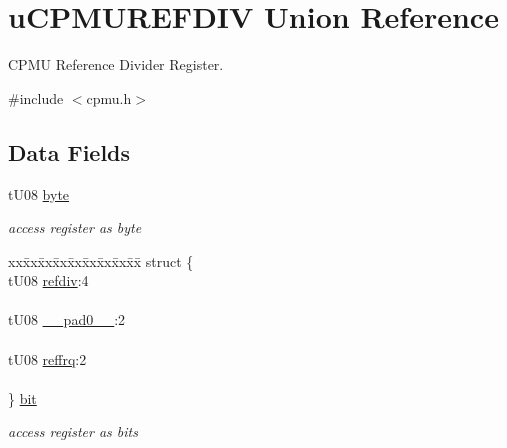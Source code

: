 \hypertarget{unionu_c_p_m_u_r_e_f_d_i_v}{}\section{u\+C\+P\+M\+U\+R\+E\+F\+D\+I\+V Union Reference}
\label{unionu_c_p_m_u_r_e_f_d_i_v}


C\+P\+M\+U Reference Divider Register.  




{\ttfamily \#include $<$cpmu.\+h$>$}

\subsection*{Data Fields}
\begin{DoxyCompactItemize}
\item 
\hypertarget{unionu_c_p_m_u_r_e_f_d_i_v_aba308d63db050aed25cfd36c37e41ad4}{}t\+U08 \hyperlink{unionu_c_p_m_u_r_e_f_d_i_v_aba308d63db050aed25cfd36c37e41ad4}{byte}\label{unionu_c_p_m_u_r_e_f_d_i_v_aba308d63db050aed25cfd36c37e41ad4}

\begin{DoxyCompactList}\small\item\em access register as byte \end{DoxyCompactList}\item 
\hypertarget{unionu_c_p_m_u_r_e_f_d_i_v_a71c4d916256415df1243e21b65117b88}{}\begin{tabbing}
xx\=xx\=xx\=xx\=xx\=xx\=xx\=xx\=xx\=\kill
struct \{\\
\>tU08 \hyperlink{unionu_c_p_m_u_r_e_f_d_i_v_a5741759fca13f93a559625888e259258}{refdiv}:4\\
\>\\
\>tU08 \hyperlink{unionu_c_p_m_u_r_e_f_d_i_v_aa3e5250d311ceb1525f9adf38f0d7982}{\_\_pad0\_\_}:2\\
\>\\
\>tU08 \hyperlink{unionu_c_p_m_u_r_e_f_d_i_v_aad055cbc9d00d060ef8837c2af2e4f8c}{reffrq}:2\\
\>\\
\} \hyperlink{unionu_c_p_m_u_r_e_f_d_i_v_a71c4d916256415df1243e21b65117b88}{bit}\label{unionu_c_p_m_u_r_e_f_d_i_v_a71c4d916256415df1243e21b65117b88}
\\

\end{tabbing}\begin{DoxyCompactList}\small\item\em access register as bits \end{DoxyCompactList}\end{DoxyCompactItemize}


